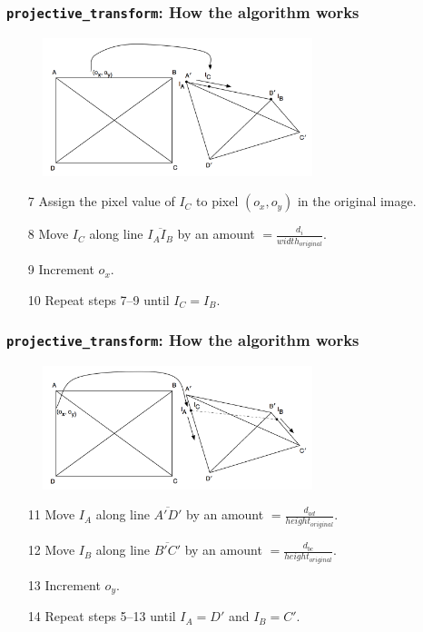 \documentclass{beamer}
\begin{document}
\begin{frame}
	\frametitle{{\tt projective\_transform}: How the algorithm works}
	\begin{figure}
		\centering
		\includegraphics[width=0.7\textwidth]{images/arbiskew_graphic_with_iterators1.png}
	\end{figure}
	\begin{enumerate}
		\item[7] Assign the pixel value of $I_C$ to pixel $(o_x, o_y)$ in the original image.
		\item[8] Move $I_C$ along line $\overline{I_A I_B}$ by an amount $= \frac{d_i}{width_{original}}$.
		\item[9] Increment $o_x$.
		\item[10] Repeat steps 7--9 until $I_C = I_B$.
	\end{enumerate}
\end{frame}

\begin{frame}
	\frametitle{{\tt projective\_transform}: How the algorithm works}
	\begin{figure}
		\centering
		\includegraphics[width=0.7\textwidth]{images/arbiskew_graphic_with_iterators2.png}
	\end{figure}
	\begin{enumerate}
	\item[11] Move $I_A$ along line $\overline{A\prime D\prime}$ by an amount $= \frac{d_{ad}}{height_{original}}$.
	\item[12] Move $I_B$ along line $\overline{B\prime C\prime}$ by an amount $= \frac{d_{bc}}{height_{original}}$.
	\item[13] Increment $o_y$.
	\item[14] Repeat steps 5--13 until $I_A = D\prime$ and $I_B = C\prime$.
	\end{enumerate}
\end{frame}
\end{document}
